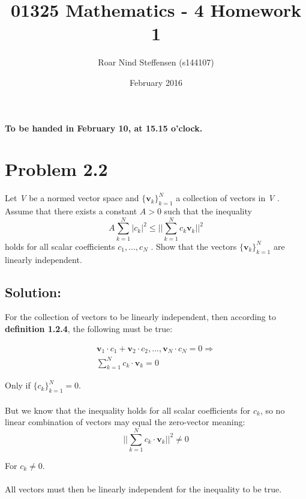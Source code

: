 \documentclass{article}
\title{01325 Mathematics - 4 Homework 1}
\author{Roar Nind Steffensen (s144107)}
\date{February 2016}
\begin{document}
\maketitle

\begin{center}
\textbf{ To be handed in February 10, at 15.15 o'clock.}
\end{center}
 \vspace{5mm}
 
\section*{Problem 2.2}

Let \textit{V} be a normed vector space and $\{\mathbf{v}_k\}_{k=1}^N$ a collection of vectors in \textit{V} . Assume that there exists a constant $A > 0$ such that the inequality
\begin{equation}
    A \sum_{k=1}^N |c_k|^2 \leq || \sum_{k=1}^N c_k \mathbf{v}_k ||^2
\end{equation}
holds for all scalar coefficients $c_1, . . . , c_N$ . Show that the vectors $\{\mathbf{v}_k\}_{k=1}^N$ are linearly independent.

\subsection*{Solution:}

For the collection of vectors to be linearly independent, then according to \textbf{definition 1.2.4}, the following must be true:

\begin{gather}
    \mathbf{v}_1 \cdot c_1+\mathbf{v}_2 \cdot c_2, ... , \mathbf{v}_N \cdot c_N =0 \Rightarrow \\
    \sum_{k=1}^N c_k \cdot \mathbf{v}_k = 0
\end{gather}

Only if $\{c_k\}_{k=1}^N = 0 $. 
\\
\\
But we know that the inequality holds for all scalar coefficients for $c_k$, so no linear combination of vectors may equal the zero-vector meaning: 
\begin{equation}
    ||\sum_{k=1}^N c_k \cdot \mathbf{v}_k ||^2 \neq  0 
\end{equation}

For $c_k \neq 0$. 
\\
\\
All vectors must then be linearly independent for the inequality to be true.
\end{document}
